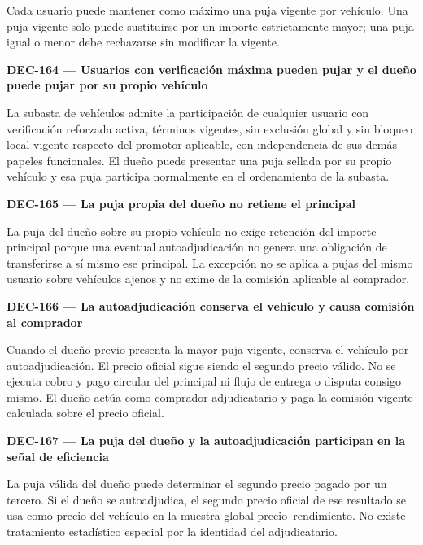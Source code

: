 \documentclass[10pt,letterpaper]{article}
\begin{document}
Cada usuario puede mantener como máximo una puja vigente por vehículo. Una puja vigente solo puede sustituirse por un importe estrictamente mayor; una puja igual o menor debe rechazarse sin modificar la vigente.\par\vspace{0.45em}
\noindent\textbf{DEC-164 --- Usuarios con verificación máxima pueden pujar y el dueño puede pujar por su propio vehículo}\par
La subasta de vehículos admite la participación de cualquier usuario con verificación reforzada activa, términos vigentes, sin exclusión global y sin bloqueo local vigente respecto del promotor aplicable, con independencia de sus demás papeles funcionales. El dueño puede presentar una puja sellada por su propio vehículo y esa puja participa normalmente en el ordenamiento de la subasta.\par\vspace{0.45em}
\noindent\textbf{DEC-165 --- La puja propia del dueño no retiene el principal}\par
La puja del dueño sobre su propio vehículo no exige retención del importe principal porque una eventual autoadjudicación no genera una obligación de transferirse a sí mismo ese principal. La excepción no se aplica a pujas del mismo usuario sobre vehículos ajenos y no exime de la comisión aplicable al comprador.\par\vspace{0.45em}
\noindent\textbf{DEC-166 --- La autoadjudicación conserva el vehículo y causa comisión al comprador}\par
Cuando el dueño previo presenta la mayor puja vigente, conserva el vehículo por autoadjudicación. El precio oficial sigue siendo el segundo precio válido. No se ejecuta cobro y pago circular del principal ni flujo de entrega o disputa consigo mismo. El dueño actúa como comprador adjudicatario y paga la comisión vigente calculada sobre el precio oficial.\par\vspace{0.45em}
\noindent\textbf{DEC-167 --- La puja del dueño y la autoadjudicación participan en la señal de eficiencia}\par
La puja válida del dueño puede determinar el segundo precio pagado por un tercero. Si el dueño se autoadjudica, el segundo precio oficial de ese resultado se usa como precio del vehículo en la muestra global precio--rendimiento. No existe tratamiento estadístico especial por la identidad del adjudicatario.\par\vspace{0.45em}
\end{document}
